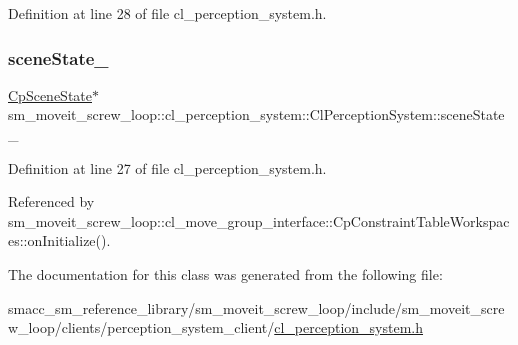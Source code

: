 Definition at line 28 of file cl\+\_\+perception\+\_\+system.\+h.

\mbox{\label{classsm__moveit__screw__loop_1_1cl__perception__system_1_1ClPerceptionSystem_abb08b3cc6d4ec414a608da92133b1f66}} 
\subsubsection{\texorpdfstring{scene\+State\+\_\+}{sceneState\_}}
{\footnotesize\ttfamily \hyperlink{classsm__moveit__screw__loop_1_1cl__perception__system_1_1CpSceneState}{Cp\+Scene\+State}$\ast$ sm\+\_\+moveit\+\_\+screw\+\_\+loop\+::cl\+\_\+perception\+\_\+system\+::\+Cl\+Perception\+System\+::scene\+State\+\_\+}



Definition at line 27 of file cl\+\_\+perception\+\_\+system.\+h.



Referenced by sm\+\_\+moveit\+\_\+screw\+\_\+loop\+::cl\+\_\+move\+\_\+group\+\_\+interface\+::\+Cp\+Constraint\+Table\+Workspaces\+::on\+Initialize().



The documentation for this class was generated from the following file\+:\begin{DoxyCompactItemize}
\item 
smacc\+\_\+sm\+\_\+reference\+\_\+library/sm\+\_\+moveit\+\_\+screw\+\_\+loop/include/sm\+\_\+moveit\+\_\+screw\+\_\+loop/clients/perception\+\_\+system\+\_\+client/\hyperlink{sm__moveit__screw__loop_2include_2sm__moveit__screw__loop_2clients_2perception__system__client_2cl__perception__system_8h}{cl\+\_\+perception\+\_\+system.\+h}\end{DoxyCompactItemize}
